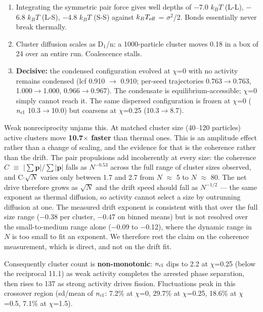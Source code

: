 \documentclass[aps,pre,preprint,superscriptaddress,nofootinbib,longbibliography]{revtex4-2}
\begin{document}
\begin{enumerate}
\item Integrating the symmetric pair force gives well depths of $-$7.0 $k_BT$ (L-L), $-$6.8 $k_BT$ (L-S), $-$4.8 $k_BT$ (S-S) against $k_BT_{\rm eff}$ = $\sigma ^{2}$/2. Bonds essentially never break thermally.
\item Cluster diffusion scales as D$_{1}$/n: a 1000-particle cluster moves 0.18 in a box of 24 over an entire run. Coalescence stalls.
\item \textbf{Decisive:} the condensed configuration evolved at $\chi$=0 with no activity remains condensed (lcf 0.910 $\rightarrow$ 0.910; per-seed trajectories 0.763$\rightarrow$0.763, 1.000$\rightarrow$1.000, 0.966$\rightarrow$0.967). The condensate is equilibrium-accessible; $\chi$=0 simply cannot reach it. The same dispersed configuration is frozen at $\chi$=0 ($n_{\rm cl}$ 10.3$\rightarrow$10.0) but coarsens at $\chi$=0.25 (10.3$\rightarrow$8.7).
\end{enumerate}

Weak nonreciprocity unjams this. At matched cluster size (40--120 particles) active clusters move \textbf{10.7$\times$ faster} than thermal ones. This is an amplitude effect rather than a change of scaling, and the evidence for that is the coherence rather than the drift. The pair propulsions add incoherently at every size: the coherence $C$ $\equiv$ $| \sum$$\mathbf{p}$$|$/$\sum |$$\mathbf{p}$$|$ falls as $N^{-0.53}$ across the full range of cluster sizes observed, and C$\cdot \sqrt{N}$ varies only between 1.7 and 2.7 from $N$ $\approx$ 5 to $N$ $\approx$ 80. The net drive therefore grows as $\sqrt{N}$ and the drift speed should fall as $N^{-1/2}$ --- the same exponent as thermal diffusion, so activity cannot select a size by outrunning diffusion at one. The measured drift exponent is consistent with that over the full size range ($-$0.38 per cluster, $-$0.47 on binned means) but is not resolved over the small-to-medium range alone ($-$0.09 to $-$0.12), where the dynamic range in $N$ is too small to fit an exponent. We therefore rest the claim on the coherence measurement, which is direct, and not on the drift fit.

Consequently cluster count is \textbf{non-monotonic}: $n_{\rm cl}$ dips to 2.2 at $\chi$=0.25 (below the reciprocal 11.1) as weak activity completes the arrested phase separation, then rises to 137 as strong activity drives fission. Fluctuations peak in this crossover region (sd/mean of $n_{\rm cl}$: 7.2\% at $\chi$=0, 29.7\% at $\chi$=0.25, 18.6\% at $\chi$=0.5, 7.1\% at $\chi$=1.5).
\end{document}
